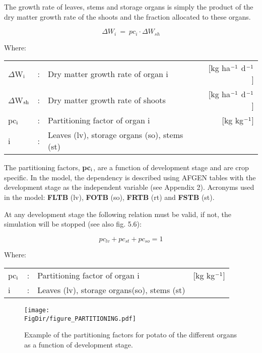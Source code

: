 The growth rate of leaves, stems and storage organs is simply the product of the dry
matter growth rate of the shoots and the fraction allocated to these organs.

\begin{equation}
\label{eq:5.45}
\Delta W_{i} ~=~ pc_{i} \cdot \Delta W_{sh} 
\end{equation}

Where:\\[5pt]
\begin{tabularx}{\textwidth}{llXr}
	$\Delta$W$_{{\rm i}}$ &:& Dry matter growth rate of organ i &
	[kg ha$^{{\rm -1}}$ d$^{{\rm -1}}$]\\
	$\Delta$W$_{{\rm sh}}$ &:& Dry matter growth rate of shoots   &
	[kg ha$^{{\rm -1}}$ d$^{{\rm -1}}$]\\
	pc$_{{\rm i}}$ &:& Partitioning factor of organ i    &
	[kg kg$^{{\rm -1}}$]\\
	i &:& Leaves (lv), storage organs (so), stems (st)
\end{tabularx}

The partitioning factors, {\bf pc$_{{\rm i}}$}, are a function of development stage and are crop specific. In
the model, the dependency is described using AFGEN tables with the development stage
as the independent variable (see Appendix 2). Acronyms used in the model: {\bf FLTB} (lv),
{\bf FOTB} (so), {\bf FRTB} (rt) and {\bf FSTB} (st).

At any development stage the following relation must be valid, if not, the simulation will
be stopped (see also fig. 5.6):

\begin{equation}
pc_{lv} + pc_{st} + pc_{so} = 1
\end{equation}

Where:\\[5pt]
\begin{tabularx}{\textwidth}{llXr}
	pc$_{{\rm i}}$ &:& Partitioning factor of organ i   &
	[kg kg$^{{\rm -1}}$]\\
	i &:& Leaves (lv), storage organs(so), stems (st)
\end{tabularx}

\begin{figure}[p]
	\centering
	\texttt{[image: \\FigDir/figure\_PARTITIONING.pdf]}
	\caption{Example of the partitioning factors for potato of the different organs as a function of development stage.}
	\label{fig:partitioning}
\end{figure}

